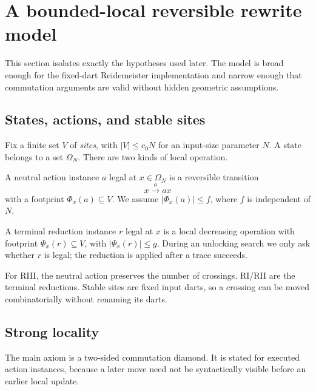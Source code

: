 \section{A bounded-local reversible rewrite model}
\label{sec:model}

This section isolates exactly the hypotheses used later.  The model is broad
enough for the fixed-dart Reidemeister implementation and narrow enough that
commutation arguments are valid without hidden geometric assumptions.

\subsection{States, actions, and stable sites}

Fix a finite set $V$ of \emph{sites}, with $|V|\leq c_0N$ for an input-size
parameter $N$.  A state belongs to a set $\Omega_N$.  There are two kinds of
local operation.

\begin{definition}
A neutral action instance $a$ legal at $x\in\Omega_N$ is a reversible transition
\[
  x \xrightarrow{a} a x
\]
with a footprint $\Phi_x(a)\subseteq V$.  We assume
$|\Phi_x(a)|\leq f$, where $f$ is independent of $N$.
\end{definition}

\begin{definition}
A terminal reduction instance $r$ legal at $x$ is a local decreasing operation
with footprint $\Psi_x(r)\subseteq V$, with
$|\Psi_x(r)|\leq g$.  During an unlocking search we only ask whether $r$ is
legal; the reduction is applied after a trace succeeds.
\end{definition}

For RIII, the neutral action preserves the number of crossings.  RI/RII are the
terminal reductions.  Stable sites are fixed input darts, so a crossing can be
moved combinatorially without renaming its darts.

\subsection{Strong locality}

The main axiom is a two-sided commutation diamond.  It is stated for executed
action instances, because a later move need not be syntactically visible before
an earlier local update.

